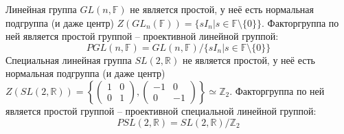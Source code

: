 \documentclass[12pt]{article}
\theoremstyle{definition}
\begin{document}
Линейная группа $GL(n,\mathbb{F})$ не является простой, у неё есть нормальная подгруппа (и даже центр) $Z(GL_n(\mathbb{F}))=\{sI_n|s\in\mathbb{F}\setminus\{0\}\}$. Факторгруппа по ней является простой группой -- проективной линейной группой:
\begin{equation}
    PGL(n,\mathbb{F})=GL(n,\mathbb{F})/\{sI_n|s\in\mathbb{F}\setminus\{0\}\}
\end{equation}
Специальная линейная группа $SL(2,\mathbb{R})$ не является простой, у неё есть нормальная подгруппа (и даже центр) $Z(SL(2,\mathbb{R}))=\left\{\begin{pmatrix}
    1 & 0\\
    0 & 1
\end{pmatrix},\begin{pmatrix}
    -1 & 0\\
    0 & -1
\end{pmatrix}\right\}\simeq\mathbb{Z}_2$. Факторгруппа по ней является простой группой -- проективной специальной линейной группой:
\begin{equation}
    PSL(2,\mathbb{R})=SL(2,\mathbb{R})/\mathbb{Z}_2
\end{equation}
\end{document}
